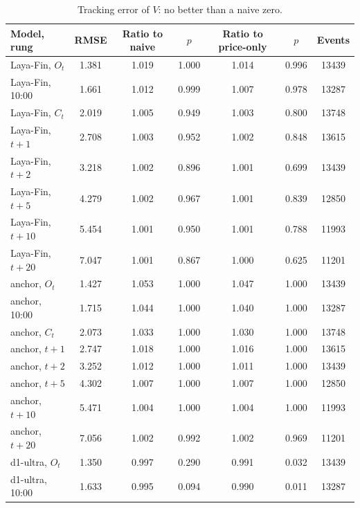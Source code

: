 \begin{table}[htbp]
\centering
\small
\begin{threeparttable}
\caption{Tracking error of $V$: no better than a naive zero.}\label{tab:a-tracking-error}
\begin{tabular}{@{}lS[table-format=1.3]S[table-format=1.3]S[table-format=1.3]S[table-format=1.3]S[table-format=1.3]S[table-format=5.0]@{}}
\toprule
Model, rung & {RMSE} & {Ratio to naive} & {$p$} & {Ratio to price-only} & {$p$} & {Events} \\
\midrule
Laya-Fin, $O_t$ & 1.381 & 1.019 & 1.000 & 1.014 & 0.996 & 13439 \\
Laya-Fin, 10:00 & 1.661 & 1.012 & 0.999 & 1.007 & 0.978 & 13287 \\
Laya-Fin, $C_t$ & 2.019 & 1.005 & 0.949 & 1.003 & 0.800 & 13748 \\
Laya-Fin, $t{+}1$ & 2.708 & 1.003 & 0.952 & 1.002 & 0.848 & 13615 \\
Laya-Fin, $t{+}2$ & 3.218 & 1.002 & 0.896 & 1.001 & 0.699 & 13439 \\
Laya-Fin, $t{+}5$ & 4.279 & 1.002 & 0.967 & 1.001 & 0.839 & 12850 \\
Laya-Fin, $t{+}10$ & 5.454 & 1.001 & 0.950 & 1.001 & 0.788 & 11993 \\
Laya-Fin, $t{+}20$ & 7.047 & 1.001 & 0.867 & 1.000 & 0.625 & 11201 \\
anchor, $O_t$ & 1.427 & 1.053 & 1.000 & 1.047 & 1.000 & 13439 \\
anchor, 10:00 & 1.715 & 1.044 & 1.000 & 1.040 & 1.000 & 13287 \\
anchor, $C_t$ & 2.073 & 1.033 & 1.000 & 1.030 & 1.000 & 13748 \\
anchor, $t{+}1$ & 2.747 & 1.018 & 1.000 & 1.016 & 1.000 & 13615 \\
anchor, $t{+}2$ & 3.252 & 1.012 & 1.000 & 1.011 & 1.000 & 13439 \\
anchor, $t{+}5$ & 4.302 & 1.007 & 1.000 & 1.007 & 1.000 & 12850 \\
anchor, $t{+}10$ & 5.471 & 1.004 & 1.000 & 1.004 & 1.000 & 11993 \\
anchor, $t{+}20$ & 7.056 & 1.002 & 0.992 & 1.002 & 0.969 & 11201 \\
d1-ultra, $O_t$ & 1.350 & 0.997 & 0.290 & 0.991 & 0.032 & 13439 \\
d1-ultra, 10:00 & 1.633 & 0.995 & 0.094 & 0.990 & 0.011 & 13287 \\

\end{tabular}
\end{threeparttable}
\end{table}
